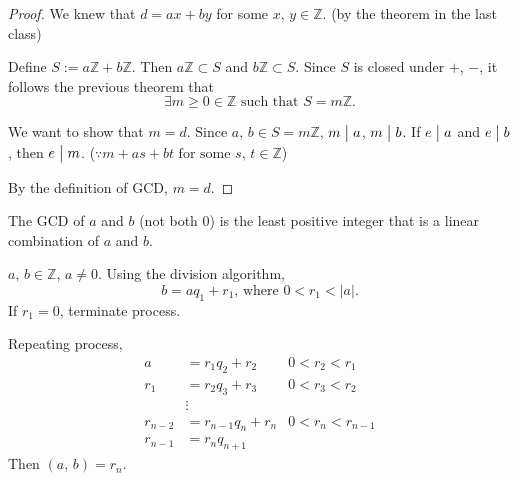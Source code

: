 \begin{proof}
    We knew that $d=ax+by$ for some $x,\,y \in \mathbb{Z}$. (by the theorem in the last class)

    Define $S := a\mathbb{Z} + b\mathbb{Z}$. Then $a\mathbb{Z} \subset S$ and $b\mathbb{Z} \subset S$.
    Since $S$ is closed under $+$, $-$, it follows the previous theorem that
    \[\exists m \geq 0 \in \mathbb{Z} \mbox{ such that } S = m\mathbb{Z}.\]

    We want to show that $m=d$. Since $a,\,b \in S = m\mathbb{Z}$, $m \bigm| a$, $m \bigm| b$.
    If $e \bigm| a$ and $e \bigm| b$, then $e \bigm| m$.
    ($\because m + as + bt \mbox{ for some } s,\,t \in \mathbb{Z}$)
    
    By the definition of GCD, $m=d$.
\end{proof}

\begin{remark}
    The GCD of $a$ and $b$ (not both 0)
    is the least positive integer that is a linear combination of $a$ and $b$.
\end{remark}


\begin{theorem}
    $a,\,b \in \mathbb{Z}$, $a \neq 0$.
    Using the division algorithm, \[b = aq_1 + r_1\mbox{, where }0<r_1<\left|a\right|.\]
    If $r_1 = 0$, terminate process.

    Repeating process,
    \begin{align*}
        a &= r_1q_2 + r_2 & 0<r_2<r_1 \\
        r_1 &= r_2q_3 + r_3 & 0<r_3<r_2 \\
        &\vdots \\
        r_{n-2} &= r_{n-1}q_n + r_n & 0<r_n<r_{n-1} \\
        r_{n-1} &= r_nq_{n+1}
    \end{align*}
    Then $\left(a,\,b\right)=r_n$.
\end{theorem}

